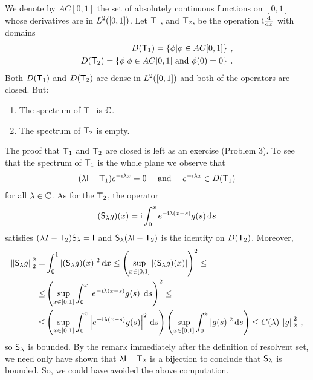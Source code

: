 \begin{example}
We denote by $AC[0, 1]$ the set of absolutely continuous functions on $[0, 1]$ whose derivatives are in $L^{2}([0,1])$. Let $\mathsf{T}_1$, and $\mathsf{T}_2$, be the operation $\mathrm{i} \frac{\mathrm{d}}{\mathrm{d}x}$ with domains
\begin{align}
    D(\mathsf{T}_1) = \left \lbrace \phi | \phi \in AC[0,1] \right \rbrace \:, \\
    D(\mathsf{T}_2) = \left \lbrace \phi | \phi \in AC[0,1] \text{ and } \phi(0)=0 \right \rbrace \:.
\end{align}
Both $D(\mathsf{T}_1)$ and $D(\mathsf{T}_2)$ are dense in $L^{2}([0,1])$ and both of the operators are closed. But: \begin{enumerate}
    \item The spectrum of $\mathsf{T}_1$ is $\mathbb{C}$.
    \item The spectrum of $\mathsf{T}_2$ is empty.
\end{enumerate}

The proof that $\mathsf{T}_1$ and $\mathsf{T}_2$ are closed is left as an exercise (Problem 3). To see that the spectrum of $\mathsf{T}_1$ is the whole plane we observe that
\begin{align}
    (\lambda \mathsf{I} - \mathsf{T}_1) e^{-\mathrm{i} \lambda x} = 0 \quad \text{ and } \quad  e^{-\mathrm{i} \lambda x} \in D(\mathsf{T}_1)
\end{align}
for all $\lambda \in \mathbb{C}$. As for the $\mathsf{T}_2$, the operator \begin{align}
    (\mathsf{S}_\lambda g)(x) = \mathrm{i} \int_0^x e^{-\mathrm{i} \lambda(x-s)} g(s) \, \mathrm{d} s
\end{align}
satisfies $(\lambda I - \mathsf{T}_2) \mathsf{S}_\lambda = \mathsf{I}$ and $\mathsf{S}_\lambda (\lambda \mathsf{I} - \mathsf{T}_2)$ is the identity on $D(\mathsf{T}_2)$. Moreover, 
\begin{align}
    \left \Vert \mathsf{S}_\lambda g \right \Vert_2^2 =& \int_0^1 |(\mathsf{S}_\lambda g)(x)|^2 \, \mathrm{d} x 
    \leq \left( \sup_{x \in [0,1]} |(\mathsf{S}_\lambda g)(x)| \right)^2 
    \leq \\ \leq&
     \left( \sup_{x \in [0,1]} \int_0^x |e^{-\mathrm{i}\lambda(x-s)} g(s)|  \, \mathrm{d} s \right)^2 \nonumber
    \leq \\ \leq&
    \left( \sup_{x \in [0,1]} \int_0^x \left|e^{-\mathrm{i}\lambda(x-s)} g(s) \right|^2  \, \mathrm{d} s \right)
    \left( \sup_{x \in [0,1]} \int_0^x |g(s)|^2 \, \mathrm{d} s \right)
    \leq C(\lambda) \left \Vert g \right \Vert_2^2 \:, \nonumber
\end{align}
so $\mathsf{S}_\lambda$ is bounded. By the remark immediately after the definition of resolvent set, we need only have shown that $\lambda \mathsf{I} - \mathsf{T}_2$ is a bijection to conclude that $\mathsf{S}_\lambda$ is bounded. So, we could have avoided the above computation.

\end{example}

